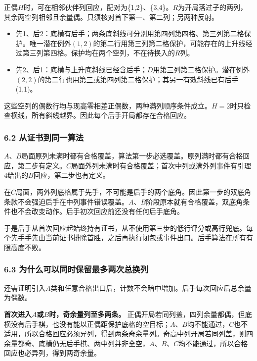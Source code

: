 \documentclass[
  a4paper,
]{article}
\providecommand{\tightlist}{%
  \setlength{\itemsep}{0pt}\setlength{\parskip}{0pt}}
\begin{document}
正偶\(H\)时，可在相邻伙伴列回应，配对为\{1,2\}、\{3,4\}。\(R\)为开局落过子的两列，其余两空列相邻且余量偶。只须核对首下第一、第二列；另两种反射。

\begin{itemize}
\tightlist
\item
  先1、后2：底横有后手；两条底斜线可分别用第四列第四格、第三列第二格保护。唯一潜在例外\((1,2)\)的第二行用第三列第二格保护，可能存在的上升线经过第三列第四格。保护均在两个空列，不在待换入的\(R\)列。
\item
  先2、后1：底横与上升底斜线已经含后手；\(D\)用第三列第二格保护。潜在例外\((2,2)\)的第二行也用第三或第四列第二格保护；其另一有效斜线已有后手(1,1)。
\end{itemize}

这些空列的偶数行均与现高零相差正偶数，两种满列顺序条件成立。\(H=2\)时只检查横线，所有斜线越界。因此每个后手开局都存在合格回应。

\subsubsection{6.2
从证书到同一算法}\label{ux4eceux8bc1ux4e66ux5230ux540cux4e00ux7b97ux6cd5}

\(A\)、\(B\)局面原列未满时都有合格覆盖，算法第一步必选覆盖。原列满时都有合格回应，第二步有定义。\(C\)局面外列未满时有合格覆盖；首次中列或满外列事件有引理4给出的\(B\)回应，第二步也有定义。

在\(C\)局面，两外列底格属于先手，不可能是后手的两个底角。因此第一步的双底角条款不会强迫后手在中列事件错误覆盖。\(A\)、\(B\)阶段原本就有合格覆盖，双底角条件也不会改变动作。后手初次回应前还没有任何后手底角。

于是后手从首次回应起始终持有证书，从不使用第三步的低行评分或高行兜底。每个先手手先由当前证书排除首胜，之后再执行闭包或事件出口。后手算法在所有有限高度不败。

\subsubsection{6.3
为什么可以同时保留最多两次总换列}\label{ux4e3aux4ec0ux4e48ux53efux4ee5ux540cux65f6ux4fddux7559ux6700ux591aux4e24ux6b21ux603bux6362ux5217}

还需证明引入\(A\)类和任意合格出口后，计数不会暗中增加。后手每次回应后总余量为偶数。

\textbf{首次进入\(A\)或\(B\)时，奇余量列至多两条。}
正偶开局若同列盖，四列余量都偶，但底横没有后手棋，也没有能以正偶距保护底格的空目标；\(A\)、\(B\)均不能通过，\(C\)也不适用，所以合格回应必须异列，得到两条奇余量列。奇高中列开局若同列盖，则四余量都奇、底横仍无后手棋、两中列并非全空，\(A\)、\(B\)、\(C\)均不能通过，所以合格回应也必异列，得到两奇余量。
\end{document}

